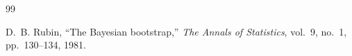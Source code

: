 \documentclass{scrartcl}
\begin{document}
\begin{thebibliography}{99}

D.~B. Rubin,
\newblock ``The Bayesian bootstrap,''
\newblock \emph{The Annals of Statistics}, vol.~9,
no.~1, pp.~130--134, 1981.
  

  







\end{thebibliography}
\end{document}
